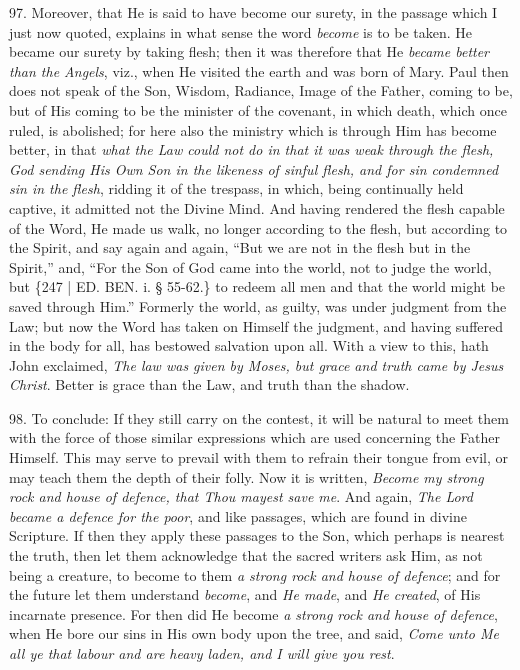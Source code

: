 97. Moreover, that He is said
to have become our surety, in the passage which I just now quoted,
explains in what sense the word \emph{become} is to be taken. He
became our surety by taking flesh; then it was therefore that He \emph{became
better than the Angels}, viz., when He visited the earth and was
born of Mary. Paul then does not speak of the Son, Wisdom, Radiance,
Image of the Father, coming to be, but of His coming to be the
minister of the covenant, in which death, which once ruled, is
abolished; for here also the ministry which is through Him has become
better, in that \emph{what the Law could not do in that it was weak
through the flesh, God sending His Own Son in the likeness of sinful
flesh, and for sin condemned sin in the flesh}, ridding it of the
trespass, in which, being continually held captive, it admitted not
the Divine Mind. And having rendered the flesh capable of the Word, He
made us walk, no longer according to the flesh, but according to the
Spirit, and say again and again, ``But we are not in the flesh but in
the Spirit,'' and, ``For the Son of God came into the world, not to
judge the world, but \{247 | ED. BEN. i. § 55-62.\} to
redeem all men and that the world might be saved through Him.''
Formerly the world, as guilty, was under judgment from the Law; but
now the Word has taken on Himself the judgment, and having suffered in
the body for all, has bestowed salvation upon all. With a view to
this, hath John exclaimed, \emph{The law was given by Moses, but grace
and truth came by Jesus Christ}. Better is grace than the Law, and
truth than the shadow.

98. To conclude: If they still
carry on the contest, it will be natural to meet them with the force
of those similar expressions which are used concerning the Father
Himself. This may serve to prevail with them to refrain their tongue
from evil, or may teach them the depth of their folly. Now it is
written, \emph{Become my strong rock and house of defence, that Thou
mayest save me}. And again, \emph{The Lord became a defence for the
poor}, and like passages, which are found in divine Scripture. If
then they apply these passages to the Son, which perhaps is nearest
the truth, then let them acknowledge that the sacred writers ask Him,
as not being a creature, to become to them \emph{a strong rock and house
of defence}; and for the future let them understand \emph{become},
and \emph{He made}, and \emph{He created}, of His incarnate presence.
For then did He become \emph{a strong rock and house of defence}, when
He bore our sins in His own body upon the tree, and said, \emph{Come unto
Me all ye that labour and are heavy laden, and I will give you rest}.

